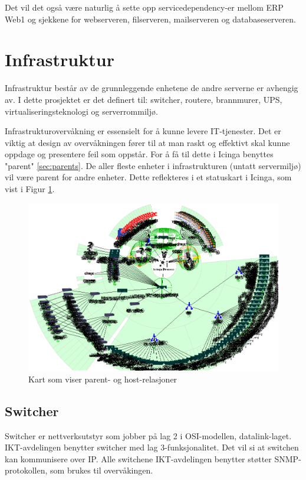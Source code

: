 Det vil det også være naturlig å sette opp servicedependency-er mellom ERP Web1 og sjekkene for webserveren, filserveren, mailserveren og databaseserveren.

\section{Infrastruktur}
Infrastruktur består av de grunnleggende enhetene de andre serverne er avhengig av. I dette prosjektet er det definert til: switcher, routere, brannmurer, UPS, virtualiseringsteknologi og serverrommiljø.

Infrastrukturovervåkning er essensielt for å kunne levere IT-tjenester. Det er viktig at design av overvåkningen fører til at man raskt og effektivt skal kunne oppdage og presentere feil som oppstår. For å få til dette i Icinga benyttes "parent" \ref{sec:parents}. De aller fleste enheter i infrastrukturen (untatt servermiljø) vil være parent for andre enheter. Dette reflekteres i et statuskart i Icinga, som vist i Figur \ref{statusmap}.

\begin{figure}[H]
    \centering
    \includegraphics[scale=0.6]{img/statusmap}
    \caption{Kart som viser parent- og host-relasjoner}
    \label{statusmap}
\end{figure}

\subsection{Switcher}\label{sec:switch}
Switcher er nettverksutstyr som jobber på lag 2 i OSI-modellen, datalink-laget. IKT-avdelingen benytter switcher med lag 3-funksjonalitet. Det vil si at switchen kan kommunisere over IP. Alle switchene IKT-avdelingen benytter støtter SNMP-protokollen, som brukes til overvåkingen.

